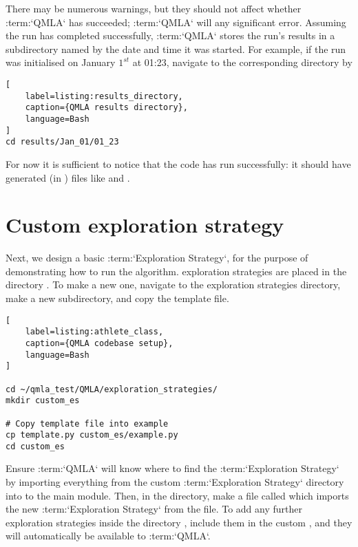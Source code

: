 There may be numerous warnings, but they should not affect whether :term:`QMLA` has succeeded; 
    :term:`QMLA` will  any significant error. 
Assuming the run has completed successfully, :term:`QMLA` stores the run's results in a subdirectory
    named by the date and time it was started.  
For example, if the run was initialised on January $1^{st}$ at 01:23, navigate to the corresponding directory by

\begin{lstlisting}[
    label=listing:results_directory,
    caption={QMLA results directory},
    language=Bash
]
cd results/Jan_01/01_23
\end{lstlisting}

For now it is sufficient to notice that the code has run successfully:
    it should have generated (in ) files like  and .

\section{Custom exploration strategy}

Next, we design a basic :term:`Exploration Strategy`, for the purpose of demonstrating how to run the algorithm.
exploration strategies are placed in the directory . 
To make a new one, navigate to the exploration strategies directory, 
make a new subdirectory, and copy the template file. 

\begin{lstlisting}[
    label=listing:athlete_class,
    caption={QMLA codebase setup},
    language=Bash
]

cd ~/qmla_test/QMLA/exploration_strategies/
mkdir custom_es

# Copy template file into example
cp template.py custom_es/example.py
cd custom_es

\end{lstlisting}

Ensure :term:`QMLA` will know where to find the :term:`Exploration Strategy` by importing everything from the custom :term:`Exploration Strategy` 
    directory into to the main  module. 
Then, in the  directory, make a file called  which imports the new :term:`Exploration Strategy`
    from the  file. 
To add any further exploration strategies inside the directory , include them in the custom ,
    and they will automatically be available to :term:`QMLA`.

